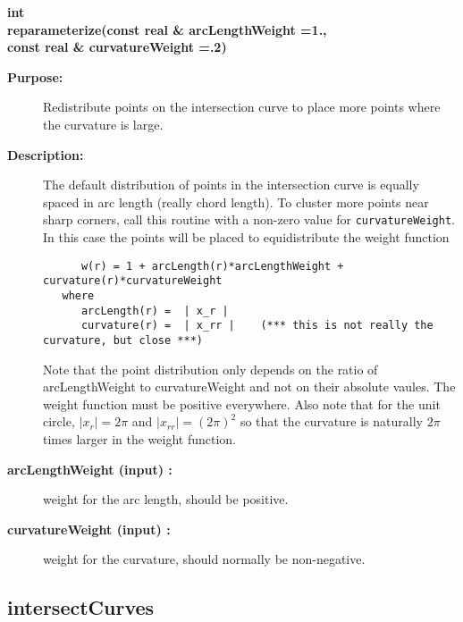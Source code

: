 \begin{flushleft} \textbf{%
int  \\ 
\settowidth{\IntersectionMappingIncludeArgIndent}{reparameterize(}%
reparameterize(const real \& arcLengthWeight  =1., \\ 
\hspace{\IntersectionMappingIncludeArgIndent}const real \& curvatureWeight  =.2)
}\end{flushleft}
\begin{description}
\item[{\bf Purpose:}]  
    Redistribute points on the intersection curve to place more points where the
  curvature is large. 
\item[{\bf Description:}]  The default distribution of points in the intersection curve
  is equally spaced in arc length (really chord length). To cluster more points
  near sharp corners, call this routine with a non-zero value for {\tt curvatureWeight}.
  In this case the points will be placed to equidistribute the weight function
  \begin{verbatim}
      w(r) = 1 + arcLength(r)*arcLengthWeight + curvature(r)*curvatureWeight
   where
      arcLength(r) =  | x_r |
      curvature(r) =  | x_rr |    (*** this is not really the curvature, but close ***)
  \end{verbatim}
 Note that the point distribution only depends on the ratio of arcLengthWeight to curvatureWeight 
 and not on their absolute vaules. The weight function must be positive everywhere.
 Also note that for the unit circle, $| x_r |=2\pi$ and $| x_{rr}|= (2\pi)^2$ so that the curvature
 is naturally $2\pi$ times larger in the weight function.

\item[{\bf arcLengthWeight (input) :}]  weight for the arc length, should be positive.
\item[{\bf curvatureWeight (input) :}]  weight for the curvature, should normally be non-negative. 
\end{description}
\subsection{intersectCurves}
 
